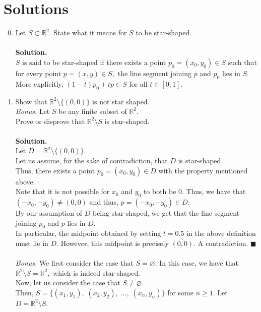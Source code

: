 \documentclass{article}
\let\emptyset\varnothing
\begin{document}
\section{Solutions}
\begin{enumerate}[label = Q.\arabic*.] 
	\setcounter{enumi}{-1}
	\item Let $S \subset \mathbb{R}^2.$ State what it means for $S$ to be star-shaped.\\\\
	\textbf{Solution.}\\
	$S$ is said to be star-shaped if there exists a point $p_0 = (x_0, y_0) \in S$ such that for every point $p = (x, y) \in S,$ the line segment joining $p$ and $p_0$ lies in $S.$\\
	More explicitly, $(1 - t)p_0 + tp \in S$ for all $t \in [0, 1].$
	\item Show that $\mathbb{R}^2\setminus\{(0, 0)\}$ is not star shaped.\\
	\emph{Bonus.} Let $S$ be any finite subset of $\mathbb{R}^2.$ \\
	Prove or disprove that $\mathbb{R}^2\setminus S$ is star-shaped.\\\\
	\textbf{Solution.}\\
	Let $D = \mathbb{R}^2\setminus\{(0, 0)\}.$\\
	Let us assume, for the sake of contradiction, that $D$ is star-shaped.\\
	Thus, there exists a point $p_0 = (x_0, y_0) \in D$ with the property mentioned above.\\
	Note that it is not possible for $x_0$ and $y_0$ to both be $0.$ Thus, we have that $(-x_0, -y_0) \neq (0, 0)$ and thus, $p = (-x_0, -y_0) \in D.$\\
	By our assumption of $D$ being star-shaped, we get that the line segment joining $p_0$ and $p$ lies in $D.$\\
	In particular, the midpoint obtained by setting $t = 0.5$ in the above definition must lie in $D.$ However, this midpoint is precisely $(0, 0).$ A contradiction. \hfill $\blacksquare$\\\\
	\emph{Bonus.} We first consider the case that $S = \emptyset.$ In this case, we have that $\mathbb{R}^2\setminus S = \mathbb{R}^2,$ which is indeed star-shaped.\\
	Now, let us consider the case that $S \neq \emptyset.$\\
	Then, $S = \{(x_1,y_1),\;(x_2,y_2),\;\ldots,\;(x_n, y_n)\}$ for some $n \ge 1.$ Let $D = \mathbb{R}^2\setminus S.$\\

\end{enumerate}
\end{document}
